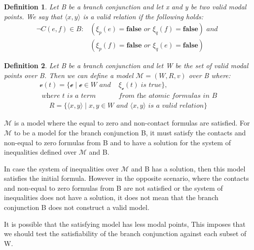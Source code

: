 \documentclass{article}
\newtheorem{defn}{Definition}[section]
\newcommand{\curvedE}{\mathscr{e}}
\newcommand{\vE}{\mathscr{v}}
\newcommand{\vBool}{\xi}
\begin{document}
	\begin{defn}
		Let B be a branch conjunction and let x and y be two valid modal points. We say that $\langle x, y \rangle$ is a valid relation if the following holds:
		\begin{align*}
				\neg C(e, f) \in B: &(\vBool_{p}(e) = \textbf{false} \textit{ or } \vBool_{q}(f) = \textbf{false}) \textit{ and } \\
				 &(\vBool_{p}(f) = \textbf{false} \textit{ or } \vBool_{q}(e) = \textbf{false})
		\end{align*}
	\end{defn}

	\begin{defn}%
	Let B be a branch conjunction and let W be the set of valid modal points over B. Then we can define a model $\mathcal{M} = (W, R, v)$ over B where:
		\begin{align*}
				\vE(t) = \{ \curvedE \; | \; \curvedE \in W \textit{ and } &\vBool_{\curvedE}(t) \; \textit{is true} \}, \\
				\textit{ where t is a term } & \textit{from the atomic formulas in B}
		\end{align*}
		\begin{align*}
				R = \{ \langle x, y \rangle\; | \; x, y \in W \textit{ and } \langle x, y \rangle \textit{ is a valid relation}\}
		\end{align*}
	\end{defn}

	$\mathcal{M}$ is a model where the equal to zero and non-contact formulas are satisfied. For $\mathcal{M}$ to be a model for the branch conjunction B,
	it must satisfy the contacts and non-equal to zero formulas from B and to have a solution for the system of inequalities defined over $\mathcal{M}$ and B.

	In case the system of inequalities over $\mathcal{M}$ and B has a solution, then this model satisfies the initial formula.
	However in the opposite scenario, where the contacts and non-equal to zero formulas from B are not satisfied or the system of inequalities does not have a solution,
	it does not mean that the branch conjunction B does not construct a valid model.

	It is possible that the satisfying model has less modal points,
	This imposes that we should test the satisfiability of the branch conjunction against each subset of W.
	
\end{document}
